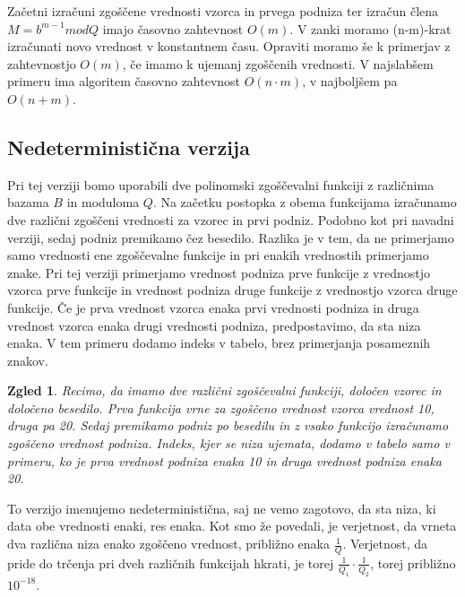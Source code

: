 \documentclass[12pt]{article}
\newtheorem{Zgled}[Izrek]{{\sc Zgled}}
\newenvironment{zgled}{\begin{Zgled}\rm}{\end{Zgled}}
\begin{document}
Začetni izračuni zgoščene vrednosti vzorca in prvega podniza ter izračun člena $M = b^{m-1}modQ$ imajo časovno zahtevnost $O(m)$.
V zanki moramo (n-m)-krat izračunati novo vrednost v konstantnem času. Opraviti moramo še k primerjav z zahtevnostjo $O(m)$, če imamo 
k ujemanj zgoščenih vrednosti. V najslabšem primeru ima algoritem časovno zahtevnost $O(n\cdot m)$, v najboljšem pa $O(n + m)$.

\subsection{Nedeterministična verzija}
Pri tej verziji bomo uporabili dve polinomski zgoščevalni funkciji z različnima bazama $B$ in moduloma $Q$. Na začetku postopka z obema funkcijama izračunamo
dve različni zgoščeni vrednosti za vzorec in prvi podniz. Podobno kot pri navadni verziji, sedaj podniz premikamo čez besedilo. Razlika je v tem,
da ne primerjamo samo vrednosti ene zgoščevalne funkcije in pri enakih vrednostih primerjamo znake. Pri tej verziji primerjamo vrednost podniza prve funkcije
z vrednostjo vzorca prve funkcije in vrednost podniza druge funkcije z vrednostjo vzorca druge funkcije. Če je prva vrednost vzorca enaka prvi vrednosti
podniza in druga vrednost vzorca enaka drugi vrednosti podniza, predpostavimo, da sta niza enaka. V tem primeru dodamo indeks v tabelo, brez primerjanja posameznih znakov.

\begin{zgled}
  Recimo, da imamo dve različni zgoščevalni funkciji, določen vzorec in določeno besedilo. Prva funkcija vrne za zgoščeno vrednost vzorca vrednost 10,
  druga pa 20. Sedaj premikamo podniz po besedilu in z vsako funkcijo izračunamo zgoščeno vrednost podniza. Indeks, kjer se niza ujemata, dodamo v tabelo
  samo v primeru, ko je prva vrednost podniza enaka 10 in druga vrednost podniza enaka 20. 
\end{zgled}

To verzijo imenujemo nedeterministična, saj ne vemo zagotovo, da sta niza, ki data obe vrednosti enaki, res enaka. Kot smo že povedali, je verjetnost,
da vrneta dva različna niza enako zgoščeno vrednost, približno enaka $\frac{1}{Q}$. Verjetnost, da pride do trčenja pri dveh različnih funkcijah hkrati,
je torej $\frac{1}{Q_1} \cdot \frac{1}{Q_2}$, torej približno $10^{-18}$.
\end{document}
